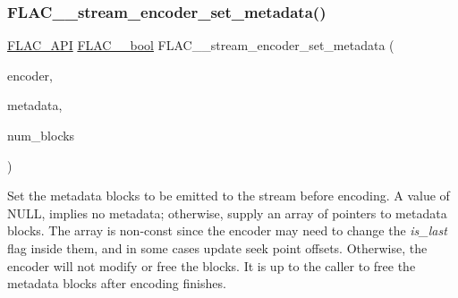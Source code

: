 \subsubsection{\texorpdfstring{FLAC\_\_stream\_encoder\_set\_metadata()}{FLAC\_\_stream\_encoder\_set\_metadata()}}
{\footnotesize\ttfamily \mbox{\hyperlink{group__flac__export_ga56ca07df8a23310707732b1c0007d6f5}{F\+L\+A\+C\+\_\+\+A\+PI}} \mbox{\hyperlink{ordinals_8h_a95103469f1cbd78b8cf250194985b34e}{F\+L\+A\+C\+\_\+\+\_\+bool}} F\+L\+A\+C\+\_\+\+\_\+stream\+\_\+encoder\+\_\+set\+\_\+metadata (\begin{DoxyParamCaption}\item[{\mbox{\hyperlink{struct_f_l_a_c_____stream_encoder}{F\+L\+A\+C\+\_\+\+\_\+\+Stream\+Encoder}} $\ast$}]{encoder,  }\item[{\mbox{\hyperlink{struct_f_l_a_c_____stream_metadata}{F\+L\+A\+C\+\_\+\+\_\+\+Stream\+Metadata}} $\ast$$\ast$}]{metadata,  }\item[{unsigned}]{num\+\_\+blocks }\end{DoxyParamCaption})}

Set the metadata blocks to be emitted to the stream before encoding. A value of {\ttfamily N\+U\+LL}, {} implies no metadata; otherwise, supply an array of pointers to metadata blocks. The array is non-\/const since the encoder may need to change the {\itshape is\+\_\+last} flag inside them, and in some cases update seek point offsets. Otherwise, the encoder will not modify or free the blocks. It is up to the caller to free the metadata blocks after encoding finishes.

